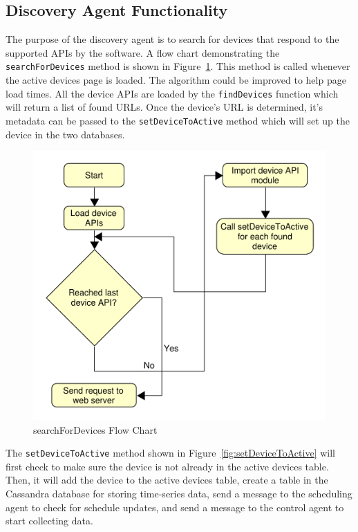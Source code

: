 \subsection{Discovery Agent Functionality}
The purpose of the discovery agent is to search for devices that respond to the supported APIs by the software. A flow chart demonstrating the \texttt{searchForDevices} method is shown in Figure~\ref{fig:searchForDevices}. This method is called whenever the active devices page is loaded. The algorithm could be improved to help page load times. All the device APIs are loaded by the \texttt{findDevices} function which will return a list of found URLs. Once the device's URL is determined, it's metadata can be passed to the \texttt{setDeviceToActive} method which will set up the device in the two databases.

\begin{figure}[H]
    \centering
    \includegraphics[scale=0.5]{figs/searchForDevices.pdf}
    \caption{searchForDevices Flow Chart}
    \label{fig:searchForDevices}
\end{figure}
The \texttt{setDeviceToActive} method shown in Figure~\ref{fig:setDeviceToActive} will first check to make sure the device is not already in the active devices table. Then, it will add the device to the active devices table, create a table in the Cassandra database for storing time-series data, send a message to the scheduling agent to check for schedule updates, and send a message to the control agent to start collecting data.
